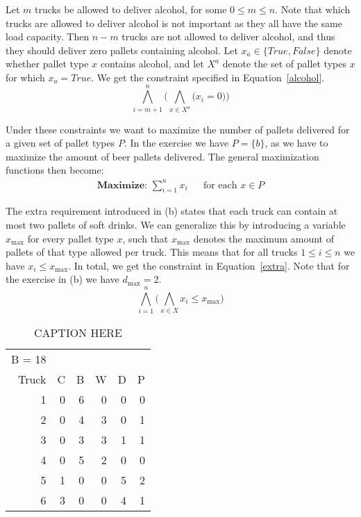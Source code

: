 Let $m$ trucks be allowed to deliver alcohol, for some $0 \leq m \leq n$. Note that which trucks are allowed to deliver alcohol is not important as they all have the same load capacity. Then $n - m$ trucks are not allowed to deliver alcohol, and thus they should deliver zero pallets containing alcohol. Let $x_a \in \{\textit{True}, \textit{False}\}$ denote whether pallet type $x$ contains alcohol, and let $X^{a}$ denote the set of pallet types $x$ for which $x_a = \textit{True}$. We get the constraint specified in Equation~\ref{alcohol}.
\begin{equation}
    \label{alcohol}
    \bigwedge^n_{i=m+1} \bigg(\bigwedge_{x \in X^a} \big( x_i = 0 \big)\bigg)
\end{equation}

Under these constraints we want to maximize the number of pallets delivered for a given set of pallet types $P$. In the exercise we have $P = \{b\}$, as we have to maximize the amount of beer pallets delivered. The general maximization functions then become:
\begin{equation}
    \begin{aligned}
    \textbf{Maximize: } \sum^n_{i=1} x_i && \text{for each }x \in P
    \end{aligned}
\end{equation}

The extra requirement introduced in (b) states that each truck can contain at most two pallets of soft drinks. We can generalize this by introducing a variable $x_{\max}$ for every pallet type $x$, such that $x_{\max}$ denotes the maximum amount of pallets of that type allowed per truck. This means that for all trucks $1 \leq i \leq n$ we have $x_i \leq x_{\max}$. In total, we get the constraint in Equation~\ref{extra}. Note that for the exercise in (b) we have $d_{\max} = 2$.
\begin{equation}
    \label{extra}
    \bigwedge^n_{i=1}\bigg( \bigwedge_{x \in X} x_i \leq x_{\max}\bigg)
\end{equation}




\begin{table}[]
  \begin{tabular}{r | r r r r r}
    B = 18\\
    Truck &  C &  B &  W &  D &  P\\\hline
        1 &  0 &  6 &  0 &  0 &  0\\
        2 &  0 &  4 &  3 &  0 &  1\\
        3 &  0 &  3 &  3 &  1 &  1\\
        4 &  0 &  5 &  2 &  0 &  0\\
        5 &  1 &  0 &  0 &  5 &  2\\
        6 &  3 &  0 &  0 &  4 &  1\\
  \end{tabular}
  \caption{CAPTION HERE}
  \label{tab:1_table}
\end{table}
